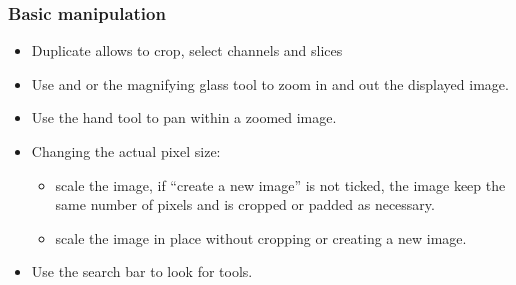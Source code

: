 \documentclass[ignorenonframetext,aspectratio=169,10pt,xcolor=table]{beamer}
\begin{document}
\begin{frame} \frametitle{Basic manipulation}

  \begin{itemize} \setlength\itemsep{1.5em}
    \item Duplicate  allows to crop, select
      channels and slices
    \item Use \keys{{+}} and \keys{-} or the magnifying glass tool to zoom
      in and out the displayed image.
    \item Use the hand tool to pan within a zoomed image.
    \item Changing the actual pixel size:
      \begin{itemize}
      \item {} scale the image, if ``create a new
        image'' is not ticked, the image keep the same number of pixels and is
        cropped or padded as necessary.
      \item {} scale the image in place
        without cropping or creating a new image.
      \end{itemize}
    \item Use the search bar to look for tools.
  \end{itemize}

\end{frame}
\end{document}
